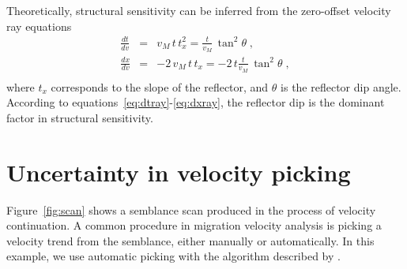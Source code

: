 Theoretically, structural sensitivity can be inferred from the zero-offset velocity ray equations \cite[]{GEO46-05-07170733,GEO68-05-16501661}
\begin{eqnarray}
\label{eq:dtray}        
\displaystyle \frac{d t}{d v} & = & v_M\,t\,t_x^2 = \frac{t}{v_M}\,\tan^2{\theta}\;, \\
 \label{eq:dxray}        
\displaystyle \frac{d x}{d v} & = & -2\,v_M\,t\,t_x = -2\,t\frac{t}{v_M}\,\tan^2{\theta}\;, \\
\end{eqnarray}
where $t_x$ corresponds to the slope of the reflector, and $\theta$ is
the reflector dip angle. According to
equations~\ref{eq:dtray}-\ref{eq:dxray}, the reflector dip is the
dominant factor in structural sensitivity.

\section{Uncertainty in velocity picking}


Figure~\ref{fig:scan} shows a semblance scan produced in the process
of velocity continuation. A common procedure in migration velocity
analysis is picking a velocity trend from the semblance, either
manually or automatically. In this example, we use automatic picking
with the algorithm described by \cite{avo}.

